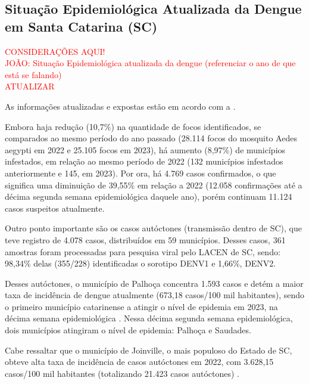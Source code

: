 \subsection{Situação Epidemiológica Atualizada da Dengue em Santa Catarina (SC)}


\begin{center}
\textcolor{red}{CONSIDERAÇÕES AQUI!}\\
\indent \textcolor{red}{JOÃO: Situação Epidemiológica atualizada da dengue (referenciar o ano de que está se falando)\\ATUALIZAR}\\
\end{center}

\indent As informações atualizadas e expostas estão em acordo com a .

\indent Embora haja redução (10,7\%) na quantidade de focos identificados, se comparados ao mesmo período do ano passado (28.114 focos do mosquito Aedes aegypti em 2022 e 25.105 focos em 2023), há aumento (8,97\%) de municípios infestados, em relação ao mesmo período de 2022 (132 municípios infestados anteriormente e 145, em 2023). Por ora, há 4.769 casos confirmados, o que significa uma diminuição de 39,55\% em relação a 2022 (12.058 confirmações até a décima segunda semana epidemiológica daquele ano), porém continuam 11.124 casos suspeitos atualmente.

\indent Outro ponto importante são os casos autóctones (transmissão dentro de \acrlong{SC}), que teve registro de 4.078 casos, distribuídos em 59 municípios. Desses casos, 361 amostras foram processadas para pesquisa viral pelo \acrfull{LACEN} de \acrlong{SC}, sendo: 98,34\% delas (355/228) identificadas o sorotipo DENV1 e 1,66\%, DENV2.

\indent Desses autóctones, o município de Palhoça concentra 1.593 casos e detém a maior taxa de incidência de dengue atualmente (673,18 casos/100 mil habitantes), sendo o primeiro município catarinense a atingir o nível de epidemia em 2023, na décima semana epidemiológica \cite{Informe6DiveSE10/23}. Nessa décima segunda semana epidemiológica, dois municípios atingiram o nível de epidemia: Palhoça e Saudades.

\indent Cabe ressaltar que o município de Joinville, o mais populoso do Estado de \acrlong{SC}, obteve alta taxa de incidência de casos autóctones em 2022, com 3.628,15 casos/100 mil habitantes (totalizando 21.423 casos autóctones) \cite{Informe31DiveSE52/22}.

